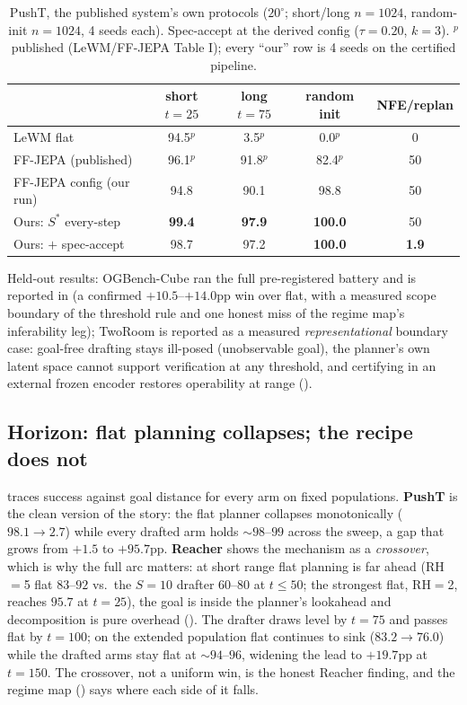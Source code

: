\documentclass{article}
\newcommand{\ours}[1]{\textbf{#1}}
\newcommand{\degc}[1]{$#1^\circ$}
\begin{document}
\begin{table}[h]
\centering
\small
\caption{PushT, the published system's own protocols (\degc{20}; short/long
$n{=}1024$, random-init $n{=}1024$, 4 seeds each). Spec-accept at the derived config
($\tau{=}0.20$, $k{=}3$). $^{p}$published (LeWM/FF-JEPA Table I); every ``our'' row is
4 seeds on the certified pipeline.}
\label{tab:headline2}
\begin{tabular}{lcccc}
\toprule
& short $t{=}25$ & long $t{=}75$ & random init & NFE/replan \\
\midrule
LeWM flat                    & 94.5$^{p}$ & 3.5$^{p}$ & 0.0$^{p}$ & 0 \\
FF-JEPA (published)          & 96.1$^{p}$ & 91.8$^{p}$ & 82.4$^{p}$ & 50 \\
FF-JEPA config (our run)     & 94.8 & 90.1 & 98.8 & 50 \\
Ours: $S^{*}$ every-step     & \ours{99.4} & \ours{97.9} & \ours{100.0} & 50 \\
Ours: $+$ spec-accept        & 98.7 & 97.2 & \ours{100.0} & \ours{1.9} \\
\bottomrule
\end{tabular}
\end{table}

Held-out results: OGBench-Cube ran the full pre-registered battery and is reported in
 (a confirmed $+10.5$--$+14.0$pp win over flat, with a
measured scope boundary of the threshold rule and one honest miss of the regime map's
inferability leg); TwoRoom is reported as a measured \emph{representational}
boundary case: goal-free drafting stays ill-posed (unobservable goal), the
planner's own latent space cannot support verification at any threshold, and
certifying in an external frozen encoder restores operability at range
().

\subsection{Horizon: flat planning collapses; the recipe does not}
\label{sec:results-horizon}
 traces success against goal distance for every arm on fixed
populations. \textbf{PushT} is the clean version of the story: the flat planner
collapses monotonically ($98.1\to2.7$) while every drafted arm holds ${\sim}98$--$99$
across the sweep, a gap that grows from $+1.5$ to $+95.7$pp. \textbf{Reacher} shows
the mechanism as a \emph{crossover}, which is why the full arc matters: at short range
flat planning is far ahead (RH$=$5 flat $83$--$92$ vs.\ the $S{=}10$ drafter $60$--$80$
at $t{\le}50$; the strongest flat, RH$=$2, reaches $95.7$ at $t{=}25$), the goal is
inside the planner's lookahead and decomposition is pure overhead ().
The drafter draws level by $t{=}75$ and passes flat by $t{=}100$; on the extended
population flat continues to sink ($83.2\to76.0$) while the drafted arms stay flat at
${\sim}94$--$96$, widening the lead to $+19.7$pp at $t{=}150$. The crossover, not a
uniform win, is the honest Reacher finding, and the regime map ()
says where each side of it falls.
\end{document}
